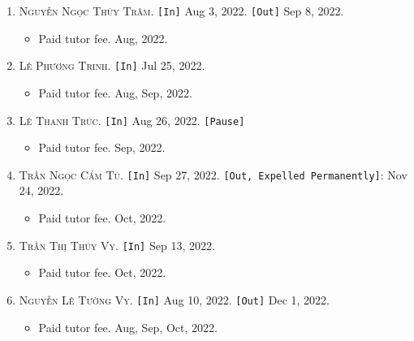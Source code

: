 \documentclass{article}
\numberwithin{equation}{section}
\begin{document}
\begin{enumerate}
	\item \textsc{Nguyễn Ngọc Thùy Trâm.} \texttt{[In]} Aug 3, 2022. \texttt{[Out]} Sep 8, 2022.
	\begin{itemize}
		\item \textsf{Paid tutor fee.} Aug, 2022.
	\end{itemize}
	\item \textsc{Lê Phương Trinh.} \texttt{[In]} Jul 25, 2022.
	\begin{itemize}
		\item \textsf{Paid tutor fee.} Aug, Sep, 2022.
	\end{itemize}
	\item \textsc{Lê Thanh Trúc.} \texttt{[In]} Aug 26, 2022. \texttt{[Pause]}
	\begin{itemize}
		\item \textsf{Paid tutor fee.} Sep, 2022.
	\end{itemize}
	\item \textsc{Trần Ngọc Cẩm Tú.} \texttt{[In]} Sep 27, 2022. \texttt{[Out, Expelled Permanently]}: Nov 24, 2022.
	\begin{itemize}
		\item \textsf{Paid tutor fee.} Oct, 2022.
	\end{itemize}
	\item \textsc{Trần Thị Thúy Vy.} \texttt{[In]} Sep 13, 2022.
	\begin{itemize}
		\item \textsf{Paid tutor fee.} Oct, 2022.
	\end{itemize}
	\item \textsc{Nguyễn Lê Tường Vy.} \texttt{[In]} Aug 10, 2022. \texttt{[Out]} Dec 1, 2022.
	\begin{itemize}
		\item \textsf{Paid tutor fee.} Aug, Sep, Oct, 2022.
	\end{itemize}
\end{enumerate}
\end{document}
